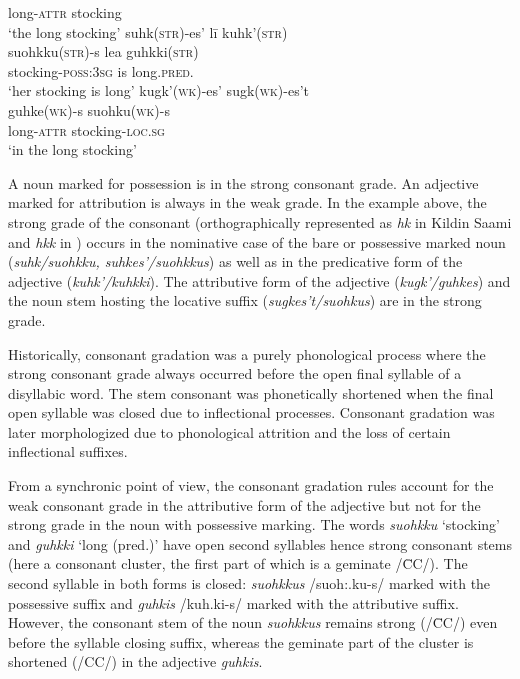 {\begin{exe}
\begin{xlist}
	long-\textsc{attr} stocking\\
\glt	‘the long stocking’
\ex 
\glll	suhk(\textsc{str})-es' lī kuhk'(\textsc{str}) 		\\
	suohkku(\textsc{str})-s lea guhkki(\textsc{str}) 	\\
	stocking-\textsc{poss:3sg} is long.\textsc{pred.}\\
\glt	‘her stocking is long’
\ex
\glll	kugk'(\textsc{wk})-es' sugk(\textsc{wk})-es't 	\\
	guhke(\textsc{wk})-s suohku(\textsc{wk})-s 	\\
	long-\textsc{attr} stocking-\textsc{loc.sg}\\
\glt	‘in the long stocking’
\end{xlist}
\end{exe}
A noun marked for possession is in the strong consonant grade. An adjective marked for attribution is always in the weak grade. In the example above, the strong grade of the consonant (orthographically represented as \textit{hk} in Kildin Saami and \textit{hkk} in ) occurs in the nominative case of the bare or possessive marked noun (\textit{suhk/suohkku, suhkes'/suohkkus}) as well as in the predicative form of the adjective (\textit{kuhk'/kuhkki}). The attributive form of the adjective (\textit{kugk'/guhkes}) and the noun stem hosting the locative suffix (\textit{sugkes't/suohkus}) are in the strong grade.

Historically, consonant gradation was a purely phonological process where the strong consonant grade always occurred before the open final syllable of a disyllabic word. The stem consonant was phonetically shortened when the final open syllable was closed due to inflectional processes. Consonant gradation was later morphologized due to phonological attrition and the loss of certain inflectional suffixes.

From a synchronic point of view, the consonant gradation rules account for the weak consonant grade in the attributive form of the adjective but not for the strong grade in the noun with possessive marking. The  words \textit{suohkku} ‘stocking’ and \textit{guhkki} ‘long (pred.)’ have open second syllables hence strong consonant stems (here a consonant cluster, the first part of which is a geminate /\=CC/). The second syllable in both forms is closed: \textit{suohkkus} /suoh:.ku-s/ marked with the possessive suffix and \textit{guhkis} /kuh.ki-s/ marked with the attributive suffix. However, the consonant stem of the noun \textit{suohkkus} remains strong (/\=CC/) even before the syllable closing suffix, whereas the geminate part of the cluster is shortened (/CC/) in the adjective \textit{guhkis}.

}
